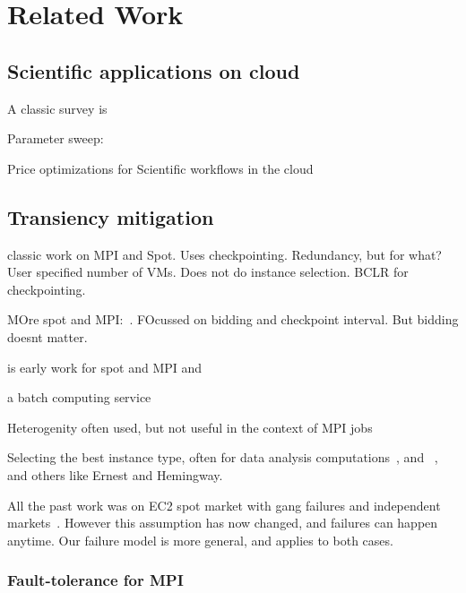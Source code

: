 \section{Related Work}

\subsection{Scientific applications on cloud}

A classic survey is ~\cite{iosup_performance_2011}
~\cite{zhai_cloud_2011}

Parameter sweep:~\cite{casanova_heuristics_2000}

Price optimizations for Scientific workflows in the cloud~\cite{gari_learning_2019}



\subsection{Transiency mitigation}

\cite{marathe2014exploiting} classic work on MPI and Spot.
Uses checkpointing.
Redundancy, but for what?
User specified number of VMs. Does not do instance selection. 
BCLR for checkpointing.



MOre spot and MPI:~\cite{gong_monetary_2015}. FOcussed on bidding and checkpoint interval. But bidding doesnt matter. 


\cite{xiang_spotmpi:_2011} is early work for spot and MPI and 

\cite{spoton} a batch computing service

Heterogenity often used, but not useful in the context of MPI jobs~\cite{exosphere}

Selecting the best instance type, often for data analysis computations~\cite{alipourfard_cherrypick}, and ~\cite{yadwadkar_selecting_2017}, and others like Ernest and Hemingway.


All the past work was on EC2 spot market with gang failures and independent markets~\cite{marathe2014exploiting, gong_monetary_2015}.
However this assumption has now changed, and failures can happen anytime.
Our failure model is more general, and applies to both cases.




\subsubsection{Fault-tolerance for MPI}

